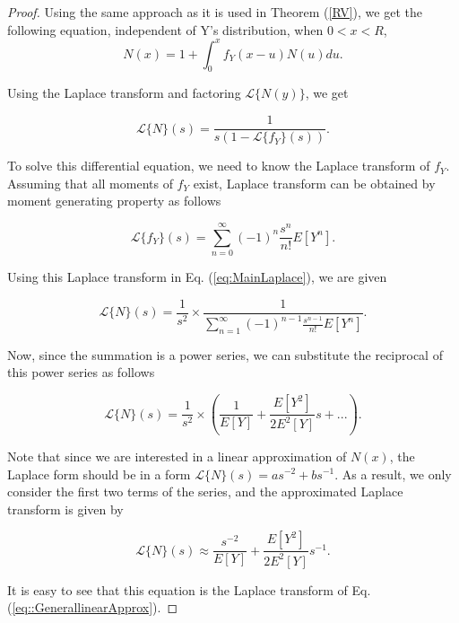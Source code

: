\documentclass[12pt, draftclsnofoot, onecolumn]{IEEEtran}
\begin{document}
\begin{proof}
Using the same approach as it is used 
in Theorem (\ref{RV}), we get the following equation, independent of Y's distribution, when $0<x<R$,
\begin{equation}
\label{eq::GeneralProofStartingEq}
	N(x) = 1+ \int_{0}^{x} f_{Y}(x-u) N(u) du. 
\end{equation}

Using the Laplace transform and factoring $\mathcal{L}\{N(y)\}$, we get

\begin{equation}
\label{eq:MainLaplace}
	\mathcal{L}\{N\} (s) = \frac{1}{s(1-\mathcal{L}\{f_{Y}\} (s))}.
\end{equation}

To solve this differential equation, we need to know the Laplace transform 
of $f_{Y}$. Assuming that all moments of $f_{Y}$ exist, Laplace 
transform can be obtained by moment generating property as follows

\begin{equation}
	\mathcal{L}\{f_{Y}\} (s) = \sum_{n=0}^{\infty} (-1)^n \frac{s^n}{n!} E[Y^n].
\end{equation}

Using this Laplace transform in Eq. (\ref{eq:MainLaplace}), we are given

\begin{equation}
	\mathcal{L}\{N\} (s) = \frac{1}{s^2} \times \frac{1}{\sum_{n=1}^{\infty} (-1)^{n-1} \frac{s^{n-1}}{n!} E[Y^n]}.
\end{equation}

Now, since the summation is a power series, we can substitute 
the reciprocal of this power series as follows \cite{realAnalysis}

\begin{equation}
	\mathcal{L}\{N\} (s) = \frac{1}{s^2} \times ( \frac{1}{E[Y]} + \frac{E[Y^2]}{2E^2[Y]}s + ... ).
\end{equation}

Note that since we are interested in a linear approximation of 
$N(x)$, the Laplace form should be in a form 
$\mathcal{L}\{N\} (s)=as^{-2}+bs^{-1}$. As a result, 
we only consider the first two terms of the series, and 
the approximated Laplace transform is given by

\begin{equation}
	\mathcal{L}\{N\} (s) \approx  \frac{s^{-2}}{E[Y]} + \frac{E[Y^2]}{2E^2[Y]}s^{-1}. 
\end{equation}

It is easy to see that this equation is the Laplace transform of Eq. (\ref{eq::GenerallinearApprox}). 


\end{proof}
\end{document}
